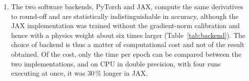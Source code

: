 \documentclass[subscriptcorrection,upint,varvw,barcolor=Goldenrod3,mathalfa=cal=euler,balance,hyphenate,french,pdf-a]{asmejour} %
\begin{document}
\begin{enumerate}
\item The two software backends, PyTorch and JAX, compute the same derivatives to round-off and are statistically indistinguishable in accuracy, although the JAX implementation was trained without the gradient-norm calibration and hence with a physics weight about six times larger (Table~\ref{tab:backend}). The choice of backend is thus a matter of computational cost and not of the result obtained. Of the cost, only the time per epoch can be compared between the two implementations, and on CPU in double precision, with four runs executing at once, it was 30\,\% longer in JAX. %


\end{enumerate}
\end{document}
